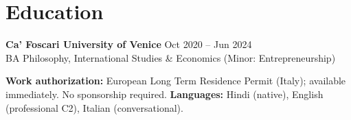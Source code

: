 \documentclass[a4paper,10pt]{article}
\begin{document}
\section{Education}
\textbf{Ca' Foscari University of Venice} \hfill Oct 2020 -- Jun 2024\\
BA Philosophy, International Studies \& Economics (Minor: Entrepreneurship)

\vspace{6pt}
{\small \textbf{Work authorization:} European Long Term Residence Permit (Italy); available immediately. No sponsorship required. \textbf{Languages:} Hindi (native), English (professional C2), Italian (conversational).}
\end{document}
